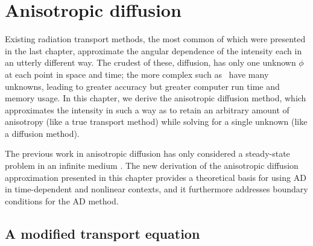 
\chapter{Anisotropic diffusion}\label{chap:adDerivation}

Existing radiation transport methods, the most common of which were presented in
the last chapter, approximate the angular dependence of the intensity each in an
utterly different way. The crudest of these, diffusion, has only one unknown
$\phi$ at each point in space and time; the more complex such as \SN\ have many
unknowns, leading to greater accuracy but greater computer run time and memory
usage. In this chapter, we derive the anisotropic diffusion method, which
approximates the intensity in such a way as to retain an arbitrary amount of
anisotropy (like a true transport method) while solving for a single unknown
(like a diffusion method).

The previous work in anisotropic diffusion has only considered a steady-state
problem in an infinite medium \cite{Lar2009c,Mor2007}. The new derivation of
the anisotropic diffusion approximation presented in this chapter provides a
theoretical basis for using AD in time-dependent and nonlinear contexts, and it
furthermore addresses boundary conditions for the AD method.

\section{A modified transport equation}\label{sec:capPsi}

